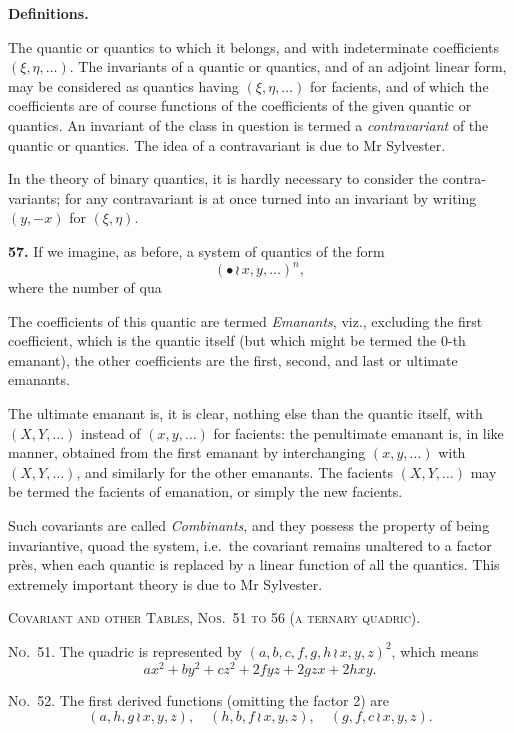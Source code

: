 \documentclass[11pt,a4paper]{article}
\begin{document}
\clearpage
\noindent\textbf{Definitions.}

The quantic or quantics to which it belongs, and with indeterminate coefficients
$(\xi, \eta, \ldots)$. The invariants of a quantic or quantics, and of an adjoint linear form, may
be considered as quantics having $(\xi, \eta, \ldots)$ for facients, and of which the coefficients
are of course functions of the coefficients of the given quantic or quantics.
An invariant of the class in question is termed a \textit{contravariant} of the quantic
or quantics. The idea of a contravariant is due to Mr Sylvester.

In the theory of binary quantics, it is hardly necessary to consider the contra-
variants; for any contravariant is at once turned into an invariant by writing
$(y, -x)$ for $(\xi, \eta)$.

\textbf{57.} If we imagine, as before, a system of quantics of the form
\[(\bullet\, \wr\, x, y, \ldots)^n,\]
where the number of qua

\bigskip
The coefficients of this quantic are termed \textit{Emanants}, viz., excluding the first
coefficient, which is the quantic itself (but which might be termed the 0-th emanant),
the other coefficients are the first, second, and last or ultimate emanants.

The ultimate emanant is, it is clear, nothing else than the quantic itself,
with $(X, Y, \ldots)$ instead of $(x, y, \ldots)$ for facients: the penultimate emanant is, in like
manner, obtained from the first emanant by interchanging $(x, y, \ldots)$ with $(X, Y, \ldots)$,
and similarly for the other emanants. The facients $(X, Y, \ldots)$ may be termed
the facients of emanation, or simply the new facients.

Such covariants are called \textit{Combinants}, and they possess the property of being
invariantive, quoad the system, i.e.\ the covariant remains unaltered to a factor pr\`es,
when each quantic is replaced by a linear function of all the quantics.
This extremely important theory is due to Mr Sylvester.

\clearpage
\noindent\textsc{Covariant and other Tables, Nos.~51 to 56 (a ternary quadric).}

\noindent\textsc{No.~51.} The quadric is represented by $(a, b, c, f, g, h \, \wr\, x, y, z)^2$,
which means
\[ax^2 + by^2 + cz^2 + 2fyz + 2gzx + 2hxy.\]

\noindent\textsc{No.~52.} The first derived functions (omitting the factor 2) are
\[(a, h, g \, \wr\, x, y, z),\quad (h, b, f \, \wr\, x, y, z),\quad (g, f, c \, \wr\, x, y, z).\]
\end{document}
